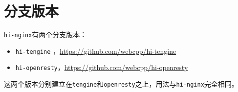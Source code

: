 \section{分支版本}
\texttt{hi-nginx}有两个分支版本：
\begin{itemize}
\item \texttt{hi-tengine} ，\url{https://github.com/webcpp/hi-tengine}
\item \texttt{hi-openresty}，\url{https://github.com/webcpp/hi-openresty}
\end{itemize}
这两个版本分别建立在\texttt{tengine}和\texttt{openresty}之上，用法与\texttt{hi-nginx}完全相同。
